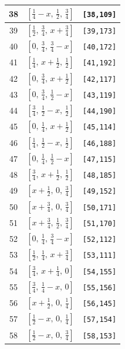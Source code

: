 \documentclass[fleqn,8pt]{jsarticle}
\begin{document}
\begin{longtable}{ccc}
38 & $\left[ \frac{1}{4} - x,\, \frac{1}{2},\, \frac{3}{4} \right]$ & {\tt [38,109]} \\ \hline
39 & $\left[ \frac{1}{2},\, \frac{3}{4},\, x + \frac{3}{4} \right]$ & {\tt [39,173]} \\ \hline
40 & $\left[ 0,\, \frac{3}{4},\, \frac{3}{4} - x \right]$ & {\tt [40,172]} \\ \hline
41 & $\left[ \frac{1}{4},\, x + \frac{1}{2},\, \frac{1}{2} \right]$ & {\tt [41,192]} \\ \hline
42 & $\left[ 0,\, \frac{3}{4},\, x + \frac{1}{2} \right]$ & {\tt [42,117]} \\ \hline
43 & $\left[ 0,\, \frac{3}{4},\, \frac{1}{2} - x \right]$ & {\tt [43,119]} \\ \hline
44 & $\left[ \frac{3}{4},\, \frac{1}{2} - x,\, \frac{1}{2} \right]$ & {\tt [44,190]} \\ \hline
45 & $\left[ 0,\, \frac{1}{4},\, x + \frac{1}{2} \right]$ & {\tt [45,114]} \\ \hline
46 & $\left[ \frac{1}{4},\, \frac{1}{2} - x,\, \frac{1}{2} \right]$ & {\tt [46,188]} \\ \hline
47 & $\left[ 0,\, \frac{1}{4},\, \frac{1}{2} - x \right]$ & {\tt [47,115]} \\ \hline
48 & $\left[ \frac{3}{4},\, x + \frac{1}{2},\, \frac{1}{2} \right]$ & {\tt [48,185]} \\ \hline
49 & $\left[ x + \frac{1}{2},\, 0,\, \frac{3}{4} \right]$ & {\tt [49,152]} \\ \hline
50 & $\left[ x + \frac{3}{4},\, 0,\, \frac{3}{4} \right]$ & {\tt [50,171]} \\ \hline
51 & $\left[ x + \frac{3}{4},\, \frac{1}{2},\, \frac{3}{4} \right]$ & {\tt [51,170]} \\ \hline
52 & $\left[ 0,\, \frac{1}{4},\, \frac{3}{4} - x \right]$ & {\tt [52,112]} \\ \hline
53 & $\left[ \frac{1}{2},\, \frac{1}{4},\, x + \frac{3}{4} \right]$ & {\tt [53,111]} \\ \hline
54 & $\left[ \frac{3}{4},\, x + \frac{1}{4},\, 0 \right]$ & {\tt [54,155]} \\ \hline
55 & $\left[ \frac{3}{4},\, \frac{1}{4} - x,\, 0 \right]$ & {\tt [55,156]} \\ \hline
56 & $\left[ x + \frac{1}{2},\, 0,\, \frac{1}{4} \right]$ & {\tt [56,145]} \\ \hline
57 & $\left[ \frac{1}{2} - x,\, 0,\, \frac{1}{4} \right]$ & {\tt [57,154]} \\ \hline
58 & $\left[ \frac{1}{2} - x,\, 0,\, \frac{3}{4} \right]$ & {\tt [58,153]} \\ \hline

\end{longtable}
\end{document}
